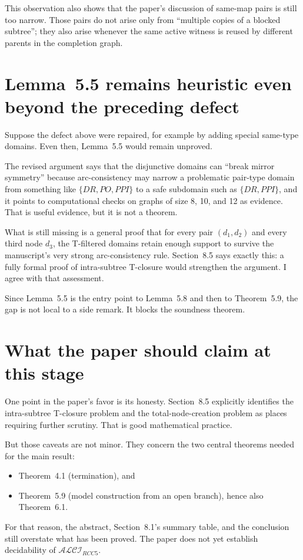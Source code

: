 \documentclass[11pt]{article}
\newcommand{\ALCIRCC}{\ensuremath{\mathcal{ALCI}_{RCC5}}}
\begin{document}
This observation also shows that the paper's discussion of same-map pairs is still too narrow.
Those pairs do not arise only from ``multiple copies of a blocked subtree''; they also arise
whenever the same active witness is reused by different parents in the completion graph.

\section{Lemma~5.5 remains heuristic even beyond the preceding defect}

Suppose the defect above were repaired, for example by adding special same-type domains.
Even then, Lemma~5.5 would remain unproved.

The revised argument says that the disjunctive domains can ``break mirror symmetry'' because
arc-consistency may narrow a problematic pair-type domain from something like
\(\{DR,PO,PPI\}\) to a safe subdomain such as \(\{DR,PPI\}\), and it points to
computational checks on graphs of size 8, 10, and 12 as evidence. That is useful evidence,
but it is not a theorem.

What is still missing is a general proof that for every pair \((d_1,d_2)\) and every third
node \(d_3\), the T-filtered domains retain enough support to survive the manuscript's very
strong arc-consistency rule. Section~8.5 says exactly this: a fully formal proof of
intra-subtree T-closure would strengthen the argument. I agree with that assessment.

Since Lemma~5.5 is the entry point to Lemma~5.8 and then to Theorem~5.9, the gap is not
local to a side remark. It blocks the soundness theorem.

\section{What the paper should claim at this stage}

One point in the paper's favor is its honesty. Section~8.5 explicitly identifies the
intra-subtree T-closure problem and the total-node-creation problem as places requiring
further scrutiny. That is good mathematical practice.

But those caveats are not minor. They concern the two central theorems needed for the main
result:
\begin{itemize}
    \item Theorem~4.1 (termination), and
    \item Theorem~5.9 (model construction from an open branch), hence also Theorem~6.1.
\end{itemize}
For that reason, the abstract, Section~8.1's summary table, and the conclusion still overstate
what has been proved. The paper does not yet establish decidability of \ALCIRCC{}.
\end{document}
